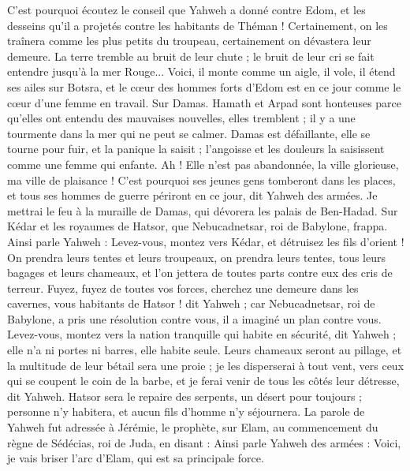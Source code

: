 \begin{multicols}{2}
C'est pourquoi écoutez le conseil que Yahweh a donné contre Edom, et les desseins qu'il a projetés contre les habitants de Théman ! Certainement, on les traînera comme les plus petits du troupeau, certainement on dévastera leur demeure.
La terre tremble au bruit de leur chute ; le bruit de leur cri se fait entendre jusqu'à la mer Rouge...
Voici, il monte comme un aigle, il vole, il étend ses ailes sur Botsra, et le cœur des hommes forts d'Edom est en ce jour comme le cœur d'une femme en travail.
Sur Damas. Hamath et Arpad sont honteuses parce qu'elles ont entendu des mauvaises nouvelles, elles tremblent ; il y a une tourmente dans la mer qui ne peut se calmer.
Damas est défaillante, elle se tourne pour fuir, et la panique la saisit ; l'angoisse et les douleurs la saisissent comme une femme qui enfante.
Ah ! Elle n'est pas abandonnée, la ville glorieuse, ma ville de plaisance !
C'est pourquoi ses jeunes gens tomberont dans les places, et tous ses hommes de guerre périront en ce jour, dit Yahweh des armées.
Je mettrai le feu à la muraille de Damas, qui dévorera les palais de Ben-Hadad.
Sur Kédar et les royaumes de Hatsor, que Nebucadnetsar, roi de Babylone, frappa. Ainsi parle Yahweh : Levez-vous, montez vers Kédar, et détruisez les fils d'orient !
On prendra leurs tentes et leurs troupeaux, on prendra leurs tentes, tous leurs bagages et leurs chameaux, et l'on jettera de toutes parts contre eux des cris de terreur.
Fuyez, fuyez de toutes vos forces, cherchez une demeure dans les cavernes, vous habitants de Hatsor ! dit Yahweh ; car Nebucadnetsar, roi de Babylone, a pris une résolution contre vous, il a imaginé un plan contre vous.
Levez-vous, montez vers la nation tranquille qui habite en sécurité, dit Yahweh ; elle n'a ni portes ni barres, elle habite seule.
Leurs chameaux seront au pillage, et la multitude de leur bétail sera une proie ; je les disperserai à tout vent, vers ceux qui se coupent le coin de la barbe, et je ferai venir de tous les côtés leur détresse, dit Yahweh.
Hatsor sera le repaire des serpents, un désert pour toujours ; personne n’y habitera, et aucun fils d'homme n'y séjournera.
La parole de Yahweh fut adressée à Jérémie, le prophète, sur Elam, au commencement du règne de Sédécias, roi de Juda, en disant :
Ainsi parle Yahweh des armées : Voici, je vais briser l'arc d'Elam, qui est sa principale force.

\end{multicols}

